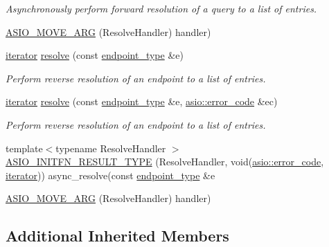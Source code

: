 \begin{DoxyCompactItemize}
\begin{DoxyCompactList}\small\item\em Asynchronously perform forward resolution of a query to a list of entries. \end{DoxyCompactList}\item 
\hyperlink{classasio_1_1ip_1_1basic__resolver_aedb7a934a3204f25bdf184736dd28812}{A\+S\+I\+O\+\_\+\+M\+O\+V\+E\+\_\+\+A\+R\+G} (Resolve\+Handler) handler)
\item 
\hyperlink{classasio_1_1ip_1_1basic__resolver_ad1cc50a31ba4971329a34eb01ef5a21c}{iterator} \hyperlink{classasio_1_1ip_1_1basic__resolver_af7d26524effd432ce5f8b1c020e94419}{resolve} (const \hyperlink{classasio_1_1ip_1_1basic__resolver_a4623878755f70037e875778a0696da9e}{endpoint\+\_\+type} \&e)
\begin{DoxyCompactList}\small\item\em Perform reverse resolution of an endpoint to a list of entries. \end{DoxyCompactList}\item 
\hyperlink{classasio_1_1ip_1_1basic__resolver_ad1cc50a31ba4971329a34eb01ef5a21c}{iterator} \hyperlink{classasio_1_1ip_1_1basic__resolver_a24fc610d4f26f2a281b6a0bb7542e0cd}{resolve} (const \hyperlink{classasio_1_1ip_1_1basic__resolver_a4623878755f70037e875778a0696da9e}{endpoint\+\_\+type} \&e, \hyperlink{classasio_1_1error__code}{asio\+::error\+\_\+code} \&ec)
\begin{DoxyCompactList}\small\item\em Perform reverse resolution of an endpoint to a list of entries. \end{DoxyCompactList}\item 
{\footnotesize template$<$typename Resolve\+Handler $>$ }\\\hyperlink{classasio_1_1ip_1_1basic__resolver_a20cdfcc805c88822e4ef3b9434aed4e3}{A\+S\+I\+O\+\_\+\+I\+N\+I\+T\+F\+N\+\_\+\+R\+E\+S\+U\+L\+T\+\_\+\+T\+Y\+P\+E} (Resolve\+Handler, void(\hyperlink{classasio_1_1error__code}{asio\+::error\+\_\+code}, \hyperlink{classasio_1_1ip_1_1basic__resolver_ad1cc50a31ba4971329a34eb01ef5a21c}{iterator})) async\+\_\+resolve(const \hyperlink{classasio_1_1ip_1_1basic__resolver_a4623878755f70037e875778a0696da9e}{endpoint\+\_\+type} \&e
\item 
\hyperlink{classasio_1_1ip_1_1basic__resolver_aedb7a934a3204f25bdf184736dd28812}{A\+S\+I\+O\+\_\+\+M\+O\+V\+E\+\_\+\+A\+R\+G} (Resolve\+Handler) handler)
\end{DoxyCompactItemize}
\subsection*{Additional Inherited Members}


